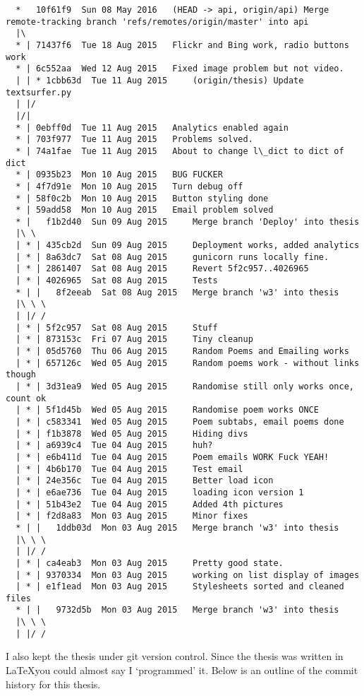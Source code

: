\begin{verbatim}
  *   10f61f9  Sun 08 May 2016	 (HEAD -> api, origin/api) Merge remote-tracking branch 'refs/remotes/origin/master' into api
  |\  
  * | 71437f6  Tue 18 Aug 2015	 Flickr and Bing work, radio buttons work
  * | 6c552aa  Wed 12 Aug 2015	 Fixed image problem but not video.
  | | * 1cbb63d  Tue 11 Aug 2015	 (origin/thesis) Update textsurfer.py
  | |/  
  |/|   
  * | 0ebff0d  Tue 11 Aug 2015	 Analytics enabled again
  * | 703f977  Tue 11 Aug 2015	 Problems solved.
  * | 74a1fae  Tue 11 Aug 2015	 About to change l\_dict to dict of dict
  * | 0935b23  Mon 10 Aug 2015	 BUG FUCKER
  * | 4f7d91e  Mon 10 Aug 2015	 Turn debug off
  * | 58f0c2b  Mon 10 Aug 2015	 Button styling done
  * | 59add58  Mon 10 Aug 2015	 Email problem solved
  * |   f1b2d40  Sun 09 Aug 2015	 Merge branch 'Deploy' into thesis
  |\ \  
  | * | 435cb2d  Sun 09 Aug 2015	 Deployment works, added analytics
  | * | 8a63dc7  Sat 08 Aug 2015	 gunicorn runs locally fine.
  | * | 2861407  Sat 08 Aug 2015	 Revert 5f2c957..4026965
  | * | 4026965  Sat 08 Aug 2015	 Tests
  * | |   8f2eeab  Sat 08 Aug 2015	 Merge branch 'w3' into thesis
  |\ \ \  
  | |/ /  
  | * | 5f2c957  Sat 08 Aug 2015	 Stuff
  | * | 873153c  Fri 07 Aug 2015	 Tiny cleanup
  | * | 05d5760  Thu 06 Aug 2015	 Random Poems and Emailing works
  | * | 657126c  Wed 05 Aug 2015	 Random poems work - without links though
  | * | 3d31ea9  Wed 05 Aug 2015	 Randomise still only works once, count ok
  | * | 5f1d45b  Wed 05 Aug 2015	 Randomise poem works ONCE
  | * | c583341  Wed 05 Aug 2015	 Poem subtabs, email poems done
  | * | f1b3878  Wed 05 Aug 2015	 Hiding divs
  | * | a6939c4  Tue 04 Aug 2015	 huh?
  | * | e6b411d  Tue 04 Aug 2015	 Poem emails WORK Fuck YEAH!
  | * | 4b6b170  Tue 04 Aug 2015	 Test email
  | * | 24e356c  Tue 04 Aug 2015	 Better load icon
  | * | e6ae736  Tue 04 Aug 2015	 loading icon version 1
  | * | 51b43e2  Tue 04 Aug 2015	 Added 4th pictures
  | * | f2d8a83  Mon 03 Aug 2015	 Minor fixes
  * | |   1ddb03d  Mon 03 Aug 2015	 Merge branch 'w3' into thesis
  |\ \ \  
  | |/ /  
  | * | ca4eab3  Mon 03 Aug 2015	 Pretty good state.
  | * | 9370334  Mon 03 Aug 2015	 working on list display of images
  | * | e1f1ead  Mon 03 Aug 2015	 Stylesheets sorted and cleaned files
  * | |   9732d5b  Mon 03 Aug 2015	 Merge branch 'w3' into thesis
  |\ \ \  
  | |/ /  
\end{verbatim}

\spirals

I also kept the thesis under git version control. Since the thesis was written in \LaTeX you could almost say I `programmed' it. Below is an outline of the commit history for this thesis.

